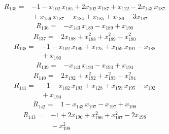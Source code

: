 \documentclass[11pt]{article}
\begin{document}
\begin{equation*}\begin{aligned}
R_{135}={}&-1 - x_{102}\,x_{185} + 2x_{102}\,x_{187} + x_{122} - 2x_{143}\,x_{187} \\
&{} + x_{159}\,x_{187} - x_{184} + x_{185} + x_{186} - 3x_{187}
\end{aligned}\end{equation*}
\begin{equation*}\begin{aligned}
R_{136}={}&-x_{143}\,x_{189} - x_{189} + x_{190}
\end{aligned}\end{equation*}
\begin{equation*}\begin{aligned}
R_{137}={}&2x_{188} + x_{188}^{2} + x_{189}^{2} - x_{190}^{2}
\end{aligned}\end{equation*}
\begin{equation*}\begin{aligned}
R_{138}={}&-1 - x_{102}\,x_{189} + x_{125} + x_{159}\,x_{191} - x_{188} \\
&{} + x_{190}
\end{aligned}\end{equation*}
\begin{equation*}\begin{aligned}
R_{139}={}&-x_{143}\,x_{193} - x_{193} + x_{194}
\end{aligned}\end{equation*}
\begin{equation*}\begin{aligned}
R_{140}={}&2x_{192} + x_{192}^{2} + x_{193}^{2} - x_{194}^{2}
\end{aligned}\end{equation*}
\begin{equation*}\begin{aligned}
R_{141}={}&-1 - x_{102}\,x_{193} + x_{128} + x_{159}\,x_{195} - x_{192} \\
&{} + x_{194}
\end{aligned}\end{equation*}
\begin{equation*}\begin{aligned}
R_{142}={}&1 - x_{143}\,x_{197} - x_{197} + x_{198}
\end{aligned}\end{equation*}
\begin{equation*}\begin{aligned}
R_{143}={}&-1 + 2x_{196} + x_{196}^{2} + x_{197}^{2} - 2x_{198} \\
&{} - x_{198}^{2}
\end{aligned}\end{equation*}
\end{document}

